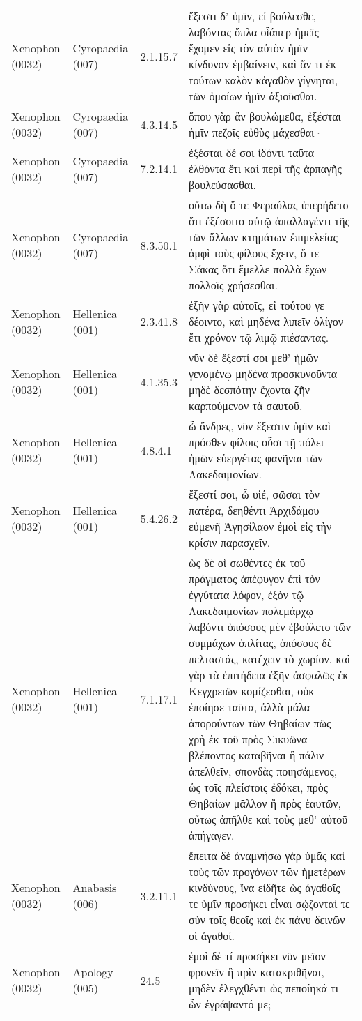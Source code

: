 \begin{longtable}{llll}
\addlinespace
Xenophon (0032) & Cyropaedia (007) & 2.1.15.7 & ἔξεστι δ’ ὑμῖν, εἰ βούλεσθε, λαβόντας ὅπλα οἷάπερ ἡμεῖς ἔχομεν εἰς τὸν αὐτὸν ἡμῖν κίνδυνον ἐμβαίνειν, καὶ ἄν τι ἐκ τούτων καλὸν κἀγαθὸν γίγνηται, τῶν ὁμοίων ἡμῖν ἀξιοῦσθαι.\\
Xenophon (0032) & Cyropaedia (007) & 4.3.14.5 & ὅπου γὰρ ἂν βουλώμεθα, ἐξέσται ἡμῖν πεζοῖς εὐθὺς μάχεσθαι·\\
Xenophon (0032) & Cyropaedia (007) & 7.2.14.1 & ἐξέσται δέ σοι ἰδόντι ταῦτα ἐλθόντα ἔτι καὶ περὶ τῆς ἁρπαγῆς βουλεύσασθαι.\\
Xenophon (0032) & Cyropaedia (007) & 8.3.50.1 & οὕτω δὴ ὅ τε Φεραύλας ὑπερήδετο ὅτι ἐξέσοιτο αὐτῷ ἀπαλλαγέντι τῆς τῶν ἄλλων κτημάτων ἐπιμελείας ἀμφὶ τοὺς φίλους ἔχειν, ὅ τε Σάκας ὅτι ἔμελλε πολλὰ ἔχων πολλοῖς χρήσεσθαι.\\
Xenophon (0032) & Hellenica (001) & 2.3.41.8 & ἐξῆν γὰρ αὐτοῖς, εἰ τούτου γε δέοιντο, καὶ μηδένα λιπεῖν ὀλίγον ἔτι χρόνον τῷ λιμῷ πιέσαντας.\\
\addlinespace
Xenophon (0032) & Hellenica (001) & 4.1.35.3 & νῦν δὲ ἔξεστί σοι μεθ’ ἡμῶν γενομένῳ μηδένα προσκυνοῦντα μηδὲ δεσπότην ἔχοντα ζῆν καρπούμενον τὰ σαυτοῦ.\\
Xenophon (0032) & Hellenica (001) & 4.8.4.1 & ὦ ἄνδρες, νῦν ἔξεστιν ὑμῖν καὶ πρόσθεν φίλοις οὖσι τῇ πόλει ἡμῶν εὐεργέτας φανῆναι τῶν Λακεδαιμονίων.\\
Xenophon (0032) & Hellenica (001) & 5.4.26.2 & ἔξεστί σοι, ὦ υἱέ, σῶσαι τὸν πατέρα, δεηθέντι Ἀρχιδάμου εὐμενῆ Ἀγησίλαον ἐμοὶ εἰς τὴν κρίσιν παρασχεῖν.\\
Xenophon (0032) & Hellenica (001) & 7.1.17.1 & ὡς δὲ οἱ σωθέντες ἐκ τοῦ πράγματος ἀπέφυγον ἐπὶ τὸν ἐγγύτατα λόφον, ἐξὸν τῷ Λακεδαιμονίων πολεμάρχῳ λαβόντι ὁπόσους μὲν ἐβούλετο τῶν συμμάχων ὁπλίτας, ὁπόσους δὲ πελταστάς, κατέχειν τὸ χωρίον, καὶ γὰρ τὰ ἐπιτήδεια ἐξῆν ἀσφαλῶς ἐκ Κεγχρειῶν κομίζεσθαι, οὐκ ἐποίησε ταῦτα, ἀλλὰ μάλα ἀπορούντων τῶν Θηβαίων πῶς χρὴ ἐκ τοῦ πρὸς Σικυῶνα βλέποντος καταβῆναι ἢ πάλιν ἀπελθεῖν, σπονδὰς ποιησάμενος, ὡς τοῖς πλείστοις ἐδόκει, πρὸς Θηβαίων μᾶλλον ἢ πρὸς ἑαυτῶν, οὕτως ἀπῆλθε καὶ τοὺς μεθ’ αὑτοῦ ἀπήγαγεν.\\
Xenophon (0032) & Anabasis (006) & 3.2.11.1 & ἔπειτα δὲ ἀναμνήσω γὰρ ὑμᾶς καὶ τοὺς τῶν προγόνων τῶν ἡμετέρων κινδύνους, ἵνα εἰδῆτε ὡς ἀγαθοῖς τε ὑμῖν προσήκει εἶναι σῴζονταί τε σὺν τοῖς θεοῖς καὶ ἐκ πάνυ δεινῶν οἱ ἀγαθοί.\\
\addlinespace
Xenophon (0032) & Apology (005) & 24.5 & ἐμοὶ δὲ τί προσήκει νῦν μεῖον φρονεῖν ἢ πρὶν κατακριθῆναι, μηδὲν ἐλεγχθέντι ὡς πεποίηκά τι ὧν ἐγράψαντό με;\\

\end{longtable}
